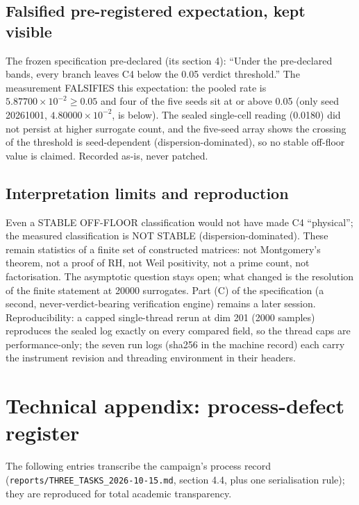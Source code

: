 \documentclass[11pt]{article}
\begin{document}
\subsection{Falsified pre-registered expectation, kept visible}

The frozen specification pre-declared (its section 4): ``Under the
pre-declared bands, every branch leaves C4 below the 0.05 verdict
threshold.'' The measurement FALSIFIES this expectation: the pooled
rate is $5.87700 \times 10^{-2} \geq 0.05$ and four of the five seeds
sit at or above 0.05 (only seed 20261001, $4.80000 \times 10^{-2}$, is
below). The sealed single-cell reading (0.0180) did not persist at
higher surrogate count, and the five-seed array shows the crossing of
the threshold is seed-dependent (dispersion-dominated), so no stable
off-floor value is claimed. Recorded as-is, never patched.

\subsection{Interpretation limits and reproduction}

Even a STABLE OFF-FLOOR classification would not have made C4
``physical''; the measured classification is NOT STABLE
(dispersion-dominated). These remain statistics of a finite set of
constructed matrices: not Montgomery's theorem, not a proof of RH, not
Weil positivity, not a prime count, not factorisation. The asymptotic
question stays open; what changed is the resolution of the finite
statement at 20000 surrogates. Part (C) of the specification (a second,
never-verdict-bearing verification engine) remains a later session.
Reproducibility: a capped single-thread rerun at dim 201 (2000 samples)
reproduces the sealed log exactly on every compared field, so the
thread caps are performance-only; the seven run logs (sha256 in the
machine record) each carry the instrument revision and threading
environment in their headers.

\section{Technical appendix: process-defect register}
The following entries transcribe the campaign's process record
(\texttt{reports/THREE\_TASKS\_2026-10-15.md}, section 4.4, plus one
serialisation rule); they are reproduced for total academic
transparency.
\end{document}
